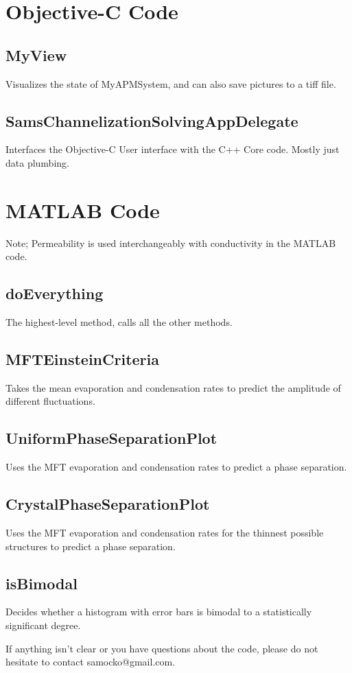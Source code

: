 \documentclass[rspublic, aps, superscriptaddress,preprintnumbers, showpacs, notitlepage]{revtex4-1}
\begin{document}
\section{Objective-C Code}


\subsection{MyView}
Visualizes the state of MyAPMSystem, and can also save pictures to a tiff file. 

\subsection{SamsChannelizationSolvingAppDelegate}
Interfaces the Objective-C User interface with the C++ Core code. Mostly just data plumbing. 



\section{MATLAB Code}

Note; Permeability is used interchangeably with conductivity in the MATLAB code. 

\subsection{doEverything}
	The highest-level method, calls all the other methods. 
\subsection{MFTEinsteinCriteria}
	Takes the mean evaporation and condensation rates to predict the amplitude of different fluctuations. 
\subsection{UniformPhaseSeparationPlot}
	Uses the MFT evaporation and condensation rates to predict a phase separation. 
\subsection{CrystalPhaseSeparationPlot}
	Uses the MFT evaporation and condensation rates for the thinnest possible structures to predict a phase separation. 
\subsection{isBimodal}
	Decides whether a histogram with error bars is bimodal to a statistically significant degree.  		









If anything isn't clear or you have questions about the code, please do not hesitate to contact samocko@gmail.com.









  
\end{document}
